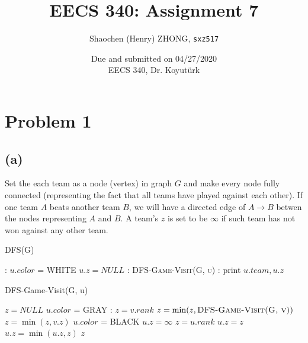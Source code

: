 \documentclass[11pt]{article}
\newcommand{\ilc}{\texttt}
\begin{document}
\title{\textbf{EECS 340: Assignment 7}}

\author{Shaochen (Henry) ZHONG, \ilc{sxz517}}
\date{Due and submitted on 04/27/2020 \\ EECS 340, Dr. Koyut{\"u}rk}
\maketitle

\section{Problem 1}

\subsection{(a)}

Set the each team as a node (vertex) in graph $G$ and make every node fully connected (representing the fact that all teams have played against each other). If one team $A$ beats another team $B$, we will have a directed edge of $A \rightarrow B$ betwen the nodes representing $A$ and $B$. A team's $z$ is set to be $\infty$ if such team has not won against any other team.

\begin{algorithm}[H]
\caption{DFS(G)}
    \begin{algorithmic}[1]
        :
            \State $u.color$ = WHITE
            \State $u.z = NULL$
        \EndFor
        :
                \State \textsc{DFS-Game-Visit(G, u)}
            \EndIf
        \EndFor
        :
            \State print $u.team, u.z$
        \EndFor
    \end{algorithmic}
\end{algorithm}

\begin{algorithm}[H]
\caption{DFS-Game-Visit(G, u)}
    \begin{algorithmic}[1]
        \State $z = NULL$
        \State $u.color$ = GRAY
        :
                \State $z = v.rank$
                \State $z = \min(z, \textsc{DFS-Game-Visit(G, v)})$
            \Else
                \State $z = \min(z, v.z)$
            \EndIf
        \EndFor
        \State $u.color$ = BLACK
            \State $u.z = \infty$
            \State $z = u.rank$
        \Else
                \State $u.z = z$
            \Else
                \State $u.z = \min(u.z, z)$
            \EndIf
        \EndIf
        \State \Return $z$
    \end{algorithmic}
\end{algorithm}
\end{document}
